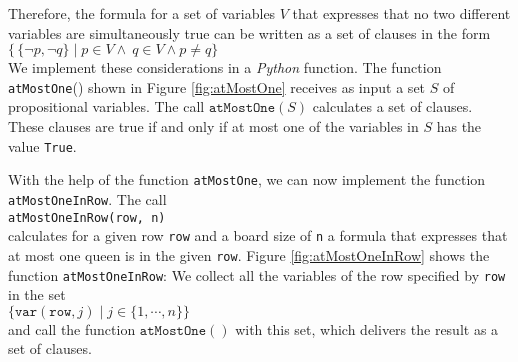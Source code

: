 \noindent
Therefore, the formula for a set of variables $V$ that expresses that no two different
variables are simultaneously true can be written as a set of clauses in the form
\\[0.2cm]
\hspace*{1.3cm}
$\bigl\{\, \{ \neg p, \neg q \} \;|\; p \in V \wedge\ q \in V \wedge p \neq q \bigr\}$
\\[0.2cm]
We implement these considerations in a \textsl{Python} function. The function \texttt{atMostOne}() shown in Figure \ref{fig:atMostOne}
receives as input a set $S$ of propositional variables. The call $\texttt{atMostOne}(S)$ calculates a set of
clauses. These clauses are true if and only if at most one of the variables in $S$
has the value \texttt{True}.

With the help of the function \texttt{atMostOne}, we can now implement the function
\texttt{atMostOneInRow}. The call \\[0.2cm]
\hspace*{1.3cm} 
\texttt{atMostOneInRow(row, n)} \\[0.2cm]
calculates for a given row \texttt{row} and a board size of \texttt{n} a formula
that expresses that at most one queen is in the given \texttt{row}.
Figure \ref{fig:atMostOneInRow} shows the
function \texttt{atMostOneInRow}: We collect all the variables of the row specified by \texttt{row}
in the set 
\\[0.2cm]
\hspace*{1.3cm}
$\bigl\{ \texttt{var}(\texttt{row},j) \mid j \in \{1, \cdots, n \} \bigr\}$
\\[0.2cm]
and call the function $\texttt{atMostOne}()$ with this set, which delivers the result
as a set of clauses.

